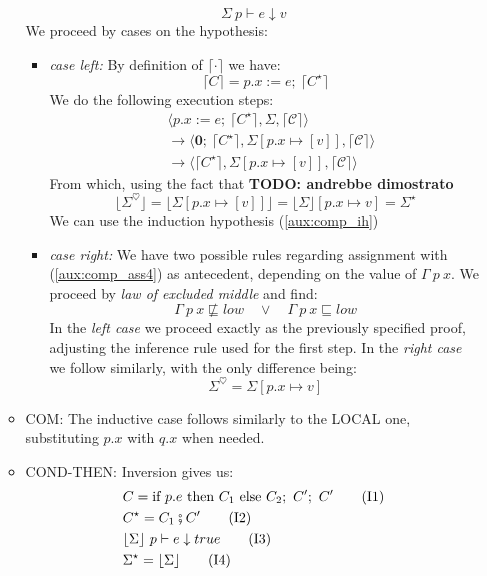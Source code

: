 \documentclass[12pt,a4paper,twoside]{book}
\newcommand{\heart}{\heartsuit}
\begin{document}
\begin{itemize}
\begin{itemize}
\begin{equation}
\Sigma~p \vdash e \downarrow v
\end{equation}
We proceed by cases on the hypothesis:
\begin{itemize}
\item \emph{case left:}
By definition of $\lceil \cdot \rceil$ we have:
$$\lceil C \rceil = p.x := e;~\lceil C^\star \rceil$$
We do the following execution steps:
\begin{align*}
&\langle p.x := e;~\lceil C^\star \rceil, \Sigma, \lceil \mathscr{C}\rceil\rangle\\
&\rightarrow\langle \boldsymbol{0};~\lceil C^\star \rceil, \Sigma[p.x \mapsto [v]], \lceil \mathscr{C} \rceil \rangle\\
&\rightarrow\langle \lceil C^\star \rceil, \Sigma[p.x \mapsto [v]], \lceil \mathscr{C} \rceil \rangle
\end{align*}
From which, using the fact that \textbf{TODO: andrebbe dimostrato}
$$
		\lfloor\Sigma^\heart\rfloor = \lfloor \Sigma[p.x \mapsto [v]] \rfloor = \lfloor \Sigma \rfloor[p.x \mapsto v] = \Sigma^\star
$$
We can use the induction hypothesis (\ref{aux:comp_ih})
\item \emph{case right:} We have two possible rules regarding assignment with (\ref{aux:comp_ass4}) as antecedent, depending on the value of $\Gamma~p~x$. We proceed by \emph{law of excluded middle} and find:
\begin{equation}\label{aux:comp_ass5}
\Gamma~p~x \not\sqsubseteq low \quad \lor \quad
\Gamma~p~x \sqsubseteq low
\end{equation}
In the \emph{left case} we proceed exactly as the previously specified proof, adjusting the inference rule used for the first step. In the \emph{right case} we follow similarly, with the only difference being:
$$
\Sigma^\heart = \Sigma[p.x\mapsto v]
$$
\end{itemize}
\item COM: The inductive case follows similarly to the LOCAL one, substituting $p.x$ with $q.x$ when needed.
\item COND-THEN: Inversion gives us:
\begin{align}
&C = \text{if } p.e \text{ then } C_1 \text{ else } C_2;~ C';~ C' \label{aux:comp_then1}\tag{I1}\\
	&C^\star = C_1 \fatsemi C'\label{aux:comp_then2}\tag{I2}\\
&\lfloor \Sigma \rfloor~p \vdash e \downarrow true \label{aux:comp_then3}\tag{I3}\\
&\Sigma^\star = \lfloor \Sigma \rfloor\label{aux:comp_then4}\tag{I4}

\end{align}
\end{itemize}
\end{itemize}
\end{document}
